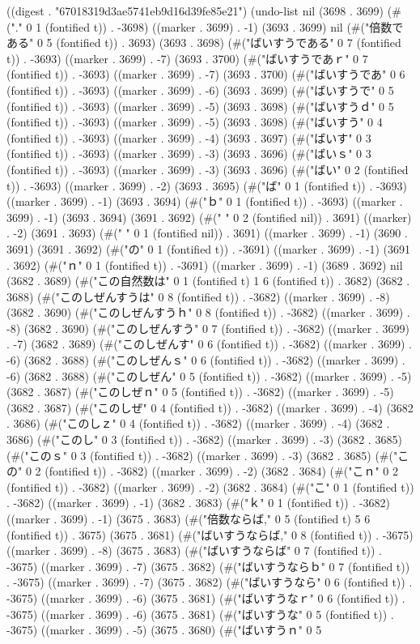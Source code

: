 
((digest . "67018319d3ae5741eb9d16d39fe85e21") (undo-list nil (3698 . 3699) (#("." 0 1 (fontified t)) . -3698) ((marker . 3699) . -1) (3693 . 3699) nil (#("倍数である" 0 5 (fontified t)) . 3693) (3693 . 3698) (#("ばいすうである" 0 7 (fontified t)) . -3693) ((marker . 3699) . -7) (3693 . 3700) (#("ばいすうであｒ" 0 7 (fontified t)) . -3693) ((marker . 3699) . -7) (3693 . 3700) (#("ばいすうであ" 0 6 (fontified t)) . -3693) ((marker . 3699) . -6) (3693 . 3699) (#("ばいすうで" 0 5 (fontified t)) . -3693) ((marker . 3699) . -5) (3693 . 3698) (#("ばいすうｄ" 0 5 (fontified t)) . -3693) ((marker . 3699) . -5) (3693 . 3698) (#("ばいすう" 0 4 (fontified t)) . -3693) ((marker . 3699) . -4) (3693 . 3697) (#("ばいす" 0 3 (fontified t)) . -3693) ((marker . 3699) . -3) (3693 . 3696) (#("ばいｓ" 0 3 (fontified t)) . -3693) ((marker . 3699) . -3) (3693 . 3696) (#("ばい" 0 2 (fontified t)) . -3693) ((marker . 3699) . -2) (3693 . 3695) (#("ば" 0 1 (fontified t)) . -3693) ((marker . 3699) . -1) (3693 . 3694) (#("ｂ" 0 1 (fontified t)) . -3693) ((marker . 3699) . -1) (3693 . 3694) (3691 . 3692) (#("  " 0 2 (fontified nil)) . 3691) ((marker) . -2) (3691 . 3693) (#(" " 0 1 (fontified nil)) . 3691) ((marker . 3699) . -1) (3690 . 3691) (3691 . 3692) (#("の" 0 1 (fontified t)) . -3691) ((marker . 3699) . -1) (3691 . 3692) (#("ｎ" 0 1 (fontified t)) . -3691) ((marker . 3699) . -1) (3689 . 3692) nil (3682 . 3689) (#("この自然数は" 0 1 (fontified t) 1 6 (fontified t)) . 3682) (3682 . 3688) (#("このしぜんすうは" 0 8 (fontified t)) . -3682) ((marker . 3699) . -8) (3682 . 3690) (#("このしぜんすうｈ" 0 8 (fontified t)) . -3682) ((marker . 3699) . -8) (3682 . 3690) (#("このしぜんすう" 0 7 (fontified t)) . -3682) ((marker . 3699) . -7) (3682 . 3689) (#("このしぜんす" 0 6 (fontified t)) . -3682) ((marker . 3699) . -6) (3682 . 3688) (#("このしぜんｓ" 0 6 (fontified t)) . -3682) ((marker . 3699) . -6) (3682 . 3688) (#("このしぜん" 0 5 (fontified t)) . -3682) ((marker . 3699) . -5) (3682 . 3687) (#("このしぜｎ" 0 5 (fontified t)) . -3682) ((marker . 3699) . -5) (3682 . 3687) (#("このしぜ" 0 4 (fontified t)) . -3682) ((marker . 3699) . -4) (3682 . 3686) (#("このしｚ" 0 4 (fontified t)) . -3682) ((marker . 3699) . -4) (3682 . 3686) (#("このし" 0 3 (fontified t)) . -3682) ((marker . 3699) . -3) (3682 . 3685) (#("このｓ" 0 3 (fontified t)) . -3682) ((marker . 3699) . -3) (3682 . 3685) (#("この" 0 2 (fontified t)) . -3682) ((marker . 3699) . -2) (3682 . 3684) (#("こｎ" 0 2 (fontified t)) . -3682) ((marker . 3699) . -2) (3682 . 3684) (#("こ" 0 1 (fontified t)) . -3682) ((marker . 3699) . -1) (3682 . 3683) (#("ｋ" 0 1 (fontified t)) . -3682) ((marker . 3699) . -1) (3675 . 3683) (#("倍数ならば," 0 5 (fontified t) 5 6 (fontified t)) . 3675) (3675 . 3681) (#("ばいすうならば," 0 8 (fontified t)) . -3675) ((marker . 3699) . -8) (3675 . 3683) (#("ばいすうならば" 0 7 (fontified t)) . -3675) ((marker . 3699) . -7) (3675 . 3682) (#("ばいすうならｂ" 0 7 (fontified t)) . -3675) ((marker . 3699) . -7) (3675 . 3682) (#("ばいすうなら" 0 6 (fontified t)) . -3675) ((marker . 3699) . -6) (3675 . 3681) (#("ばいすうなｒ" 0 6 (fontified t)) . -3675) ((marker . 3699) . -6) (3675 . 3681) (#("ばいすうな" 0 5 (fontified t)) . -3675) ((marker . 3699) . -5) (3675 . 3680) (#("ばいすうｎ" 0 5 